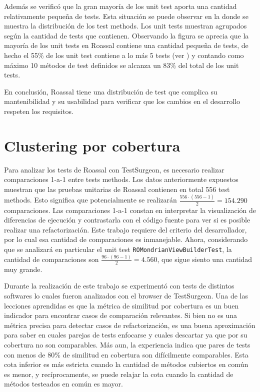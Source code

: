 \par Además se verificó que la gran mayoría de los unit test aporta una cantidad relativamente pequeña de tests. Esta situación se puede observar en la  donde se muestra la distribución de los test methods. Los unit tests muestran agrupados según la cantidad de tests que contienen. Observando la figura se aprecia que la mayoría de los unit tests en Roassal contiene una cantidad pequeña de tests, de hecho el 55\% de los unit test contiene a lo más 5 tests (ver ) y contando como máximo 10 métodos de test definidos se alcanza un 83\% del total de los unit tests. 


\par En conclusión, Roassal tiene una distribución de test que complica su mantenibilidad y su usabilidad para verificar que los cambios en el desarrollo respeten los requisitos. 


\section{Clustering por cobertura}

\par Para analizar los tests de Roassal con TestSurgeon, es necesario realizar comparaciones 1-a-1 entre tests methods. Los datos anteriormente expuestos muestran que las pruebas unitarias de Roassal contienen en total 556 test methods. Esto significa que potencialmente se realizarán $\frac{556 \cdot \left(556 -1 \right)}{2} = 154.290$ comparaciones. Las comparaciones 1-a-1 constan en interpretar la visualización de diferencias de ejecución y contrastarla con el código fuente para ver si es posible realizar una refactorización. Este trabajo requiere del criterio del desarrollador, por lo cual esa cantidad de comparaciones es inmanejable. Ahora, considerando que se analizará en particular el unit test {\tt ROMondrianViewBuilderTest}, la cantidad de comparaciones son $\frac{96 \cdot \left(96 -1 \right)}{2} = 4.560$, que sigue siento una cantidad muy grande.

\par Durante la realización de este trabajo se experimentó con tests de distintos softwares lo cuales fueron analizados con el browser de TestSurgeon. Una de las lecciones aprendidas es que la métrica de similitud por cobertura es un buen indicador para encontrar casos de comparación relevantes. Si bien no es una métrica precisa para detectar casos de refactorización, es una buena aproximación para saber en cuales parejas de tests enfocarse y cuales descartar ya que por su cobertura no son comparables. Más aun, la experiencia indica que pares de tests con menos de 80\% de similitud en cobertura son difícilmente comparables. Esta cota inferior es más estricta cuando la cantidad de métodos cubiertos en común es menor, y recíprocamente, se puede relajar la cota cuando la cantidad de métodos testeados en común es mayor. 


